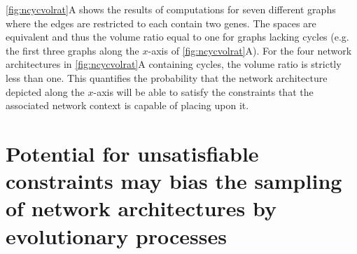 \ref{fig:ncycvolrat}A shows the results of computations for seven different graphs where the edges are restricted to each contain two genes. The spaces are equivalent and thus the volume ratio equal to one for graphs lacking cycles (e.g. the first three graphs along the $x$-axis of \ref{fig:ncycvolrat}A). For the four network architectures in \ref{fig:ncycvolrat}A containing cycles, the volume ratio is strictly less than one. This quantifies the probability that the network architecture depicted along the $x$-axis will be able to satisfy the constraints that the associated network context is capable of placing upon it.

\section{Potential for unsatisfiable constraints may bias the sampling of network architectures by evolutionary processes}\label{sec:unsatisfiableconstrevolution}


